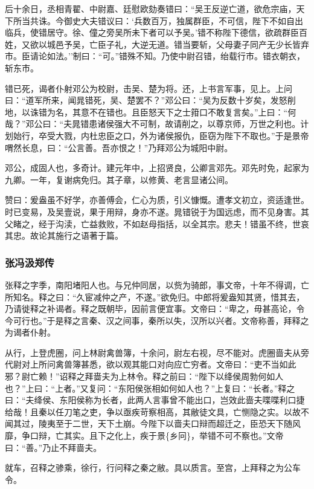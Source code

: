 \documentclass[]{article}
\begin{document}
后十余日，丞相青翟、中尉嘉、廷慰欧劾奏错曰：``吴王反逆亡道，欲危宗庙，天下所当共诛。今御史大夫错议曰：`兵数百万，独属群臣，不可信，陛下不如自出临兵，使错居守。徐、僮之旁吴所未下者可以予吴。'错不称陛下德信，欲疏群臣百姓，又欲以城邑予吴，亡臣子礼，大逆无道。错当要斩，父母妻子同产无少长皆弃市。臣请论如法。''制曰：``可。''错殊不知。乃使中尉召错，绐载行市。错衣朝衣，斩东市。

错已死，谒者仆射邓公为校尉，击吴、楚为将。还，上书言军事，见上。上问曰：``道军所来，闻晁错死，吴、楚罢不？''邓公曰：``吴为反数十岁矣，发怒削地，以诛错为名，其意不在错也。且臣怒天下之士箝口不敢复言矣。''上曰：``何哉？''邓公曰：``夫晁错患诸侯强大不可制，故请削之，以尊京师，万世之利也。计划始行，卒受大戮，内杜忠臣之口，外为诸侯报仇，臣窃为陛下不取也。''于是景帝喟然长息，曰：``公言善。吾亦恨之！''乃拜邓公为城阳中尉。

邓公，成固人也，多奇计。建元年中，上招贤良，公卿言邓先。邓先时免，起家为九卿。一年，复谢病免归。其子章，以修黄、老言显诸公间。

赞曰：爰盎虽不好学，亦善傅会，仁心为质，引义慷慨。遭孝文初立，资适逢世。时已变易，及吴壹说，果于用辩，身亦不遂。晁错锐于为国远虑，而不见身害。其父睹之，经于沟渎，亡益救败，不如赵母指括，以全其宗。悲夫！错虽不终，世哀其忠。故论其施行之语著于篇。

\hypertarget{header-n4193}{%
\subsubsection{张冯汲郑传}\label{header-n4193}}

张释之字季，南阳堵阳人也。与兄仲同居，以赀为骑郎，事文帝，十年不得调，亡所知名。释之曰：``久宦减仲之产，不遂。''欲免归。中郎将爰盎知其贤，惜其去，乃请徙释之补谒者。释之既朝毕，因前言便宜事。文帝曰：``卑之，毋甚高论，令今可行也。''于是释之言秦、汉之间事，秦所以失，汉所以兴者。文帝称善，拜释之为谒者仆射。

从行，上登虎圈，问上林尉禽兽簿，十余问，尉左右视，尽不能对。虎圈啬夫从旁代尉对上所问禽兽簿甚悉，欲以观其能口对向应亡穷者。文帝曰：``吏不当如此邪？尉亡赖！''诏释之拜啬夫为上林令。释之前曰：``陛下以绛侯周勃何如人也？''上曰：``上者。''又复问：``东阳侯张相如何如人也？''上复曰：``长者。''释之曰：``夫绛侯、东阳侯称为长者，此两人言事曾不能出口，岂效此啬夫喋喋利口捷给哉！且秦以任刀笔之吏，争以亟疾苛察相高，其敝徒文具，亡恻隐之实。以故不闻其过，陵夷至于二世，天下土崩。今陛下以啬夫口辩而超迁之，臣恐天下随风靡，争口辩，亡其实。且下之化上，疾于景\{乡冋\}，举错不可不察也。''文帝曰：``善。''乃止不拜啬夫。

就车，召释之骖乘，徐行，行问释之秦之敝。具以质言。至宫，上拜释之为公车令。
\end{document}
